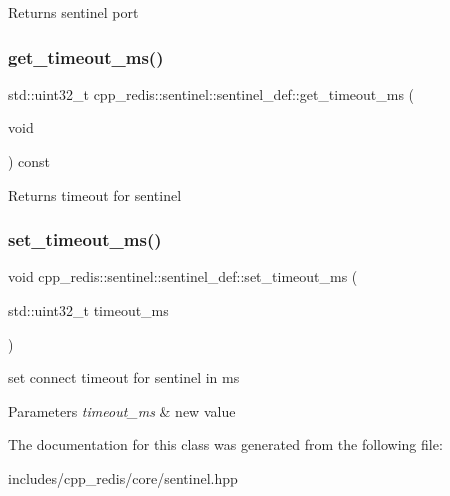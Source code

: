 \begin{DoxyReturn}{Returns}
sentinel port 
\end{DoxyReturn}
\mbox{\label{classcpp__redis_1_1sentinel_1_1sentinel__def_af7aa53bdf7bd56becdad9205e82949c5}} 
\subsubsection{\texorpdfstring{get\+\_\+timeout\+\_\+ms()}{get\_timeout\_ms()}}
{\footnotesize\ttfamily std\+::uint32\+\_\+t cpp\+\_\+redis\+::sentinel\+::sentinel\+\_\+def\+::get\+\_\+timeout\+\_\+ms (\begin{DoxyParamCaption}\item[{void}]{ }\end{DoxyParamCaption}) const\hspace{0.3cm}{\ttfamily [inline]}}

\begin{DoxyReturn}{Returns}
timeout for sentinel 
\end{DoxyReturn}
\mbox{\label{classcpp__redis_1_1sentinel_1_1sentinel__def_abc234e6c289f7b3d95868ae32343ff92}} 
\subsubsection{\texorpdfstring{set\+\_\+timeout\+\_\+ms()}{set\_timeout\_ms()}}
{\footnotesize\ttfamily void cpp\+\_\+redis\+::sentinel\+::sentinel\+\_\+def\+::set\+\_\+timeout\+\_\+ms (\begin{DoxyParamCaption}\item[{std\+::uint32\+\_\+t}]{timeout\+\_\+ms }\end{DoxyParamCaption})\hspace{0.3cm}{\ttfamily [inline]}}

set connect timeout for sentinel in ms 
\begin{DoxyParams}{Parameters}
{\em timeout\+\_\+ms} & new value \\
\hline
\end{DoxyParams}


The documentation for this class was generated from the following file\+:\begin{DoxyCompactItemize}
\item 
includes/cpp\+\_\+redis/core/sentinel.\+hpp\end{DoxyCompactItemize}
